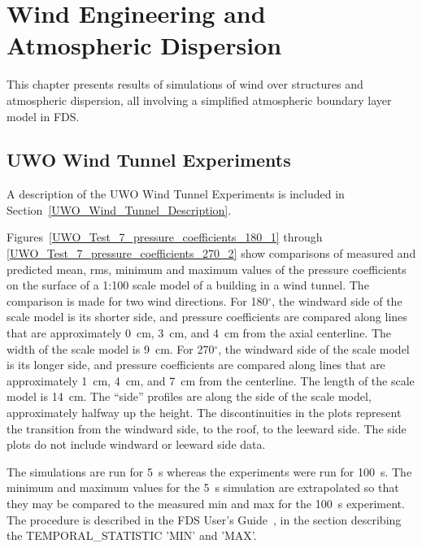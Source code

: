 
\chapter{Wind Engineering and Atmospheric Dispersion}

This chapter presents results of simulations of wind over structures and atmospheric dispersion, all involving a simplified atmospheric boundary layer model in FDS.


\section{UWO Wind Tunnel Experiments}

A description of the UWO Wind Tunnel Experiments is included in Section~\ref{UWO_Wind_Tunnel_Description}.

Figures~\ref{UWO_Test_7_pressure_coefficients_180_1} through \ref{UWO_Test_7_pressure_coefficients_270_2} show comparisons of measured and predicted mean, rms, minimum and maximum values of the pressure coefficients on the surface of a 1:100 scale model of a building in a wind tunnel. The comparison is made for two wind directions. For 180$^\circ$, the windward side of the scale model is its shorter side, and pressure coefficients are compared along lines that are approximately 0~cm, 3~cm, and 4~cm from the axial centerline. The width of the scale model is 9~cm. For 270$^\circ$, the windward side of the scale model is its longer side, and pressure coefficients are compared along lines that are approximately 1~cm, 4~cm, and 7~cm from the centerline. The length of the scale model is 14~cm. The ``side'' profiles are along the side of the scale model, approximately halfway up the height. The discontinuities in the plots represent the transition from the windward side, to the roof, to the leeward side. The side plots do not include windward or leeward side data.

The simulations are run for 5~s whereas the experiments were run for 100~s. The minimum and maximum values for the 5~s simulation are extrapolated so that they may be compared to the measured min and max for the 100~s experiment. The procedure is described in the FDS User's Guide~\cite{FDS_Users_Guide}, in the section describing the {\ct TEMPORAL\_STATISTIC} {\ct 'MIN'} and {\ct 'MAX'}.

